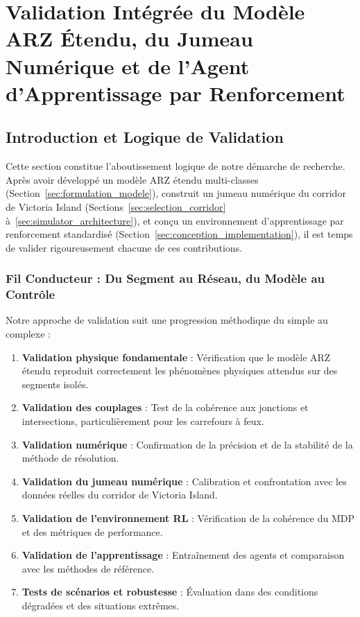 \section{Validation Intégrée du Modèle ARZ Étendu, du Jumeau Numérique et de l'Agent d'Apprentissage par Renforcement}
\label{sec:validation_entrainement}

\subsection{Introduction et Logique de Validation}
\label{sec:intro_logique_validation}

Cette section constitue l'aboutissement logique de notre démarche de recherche. Après avoir développé un modèle ARZ étendu multi-classes (Section~\ref{sec:formulation_modele}), construit un jumeau numérique du corridor de Victoria Island (Sections~\ref{sec:selection_corridor} à~\ref{sec:simulator_architecture}), et conçu un environnement d'apprentissage par renforcement standardisé (Section~\ref{sec:conception_implementation}), il est temps de valider rigoureusement chacune de ces contributions.

\subsubsection{Fil Conducteur : Du Segment au Réseau, du Modèle au Contrôle}
\label{subsec:fil_conducteur}

Notre approche de validation suit une progression méthodique du simple au complexe :
\begin{enumerate}
    \item \textbf{Validation physique fondamentale} : Vérification que le modèle ARZ étendu reproduit correctement les phénomènes physiques attendus sur des segments isolés.
    \item \textbf{Validation des couplages} : Test de la cohérence aux jonctions et intersections, particulièrement pour les carrefours à feux.
    \item \textbf{Validation numérique} : Confirmation de la précision et de la stabilité de la méthode de résolution.
    \item \textbf{Validation du jumeau numérique} : Calibration et confrontation avec les données réelles du corridor de Victoria Island.
    \item \textbf{Validation de l'environnement RL} : Vérification de la cohérence du MDP et des métriques de performance.
    \item \textbf{Validation de l'apprentissage} : Entraînement des agents et comparaison avec les méthodes de référence.
    \item \textbf{Tests de scénarios et robustesse} : Évaluation dans des conditions dégradées et des situations extrêmes.
\end{enumerate}

